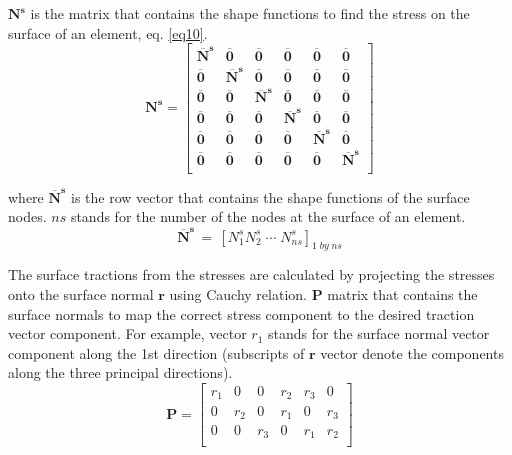\documentclass{article}
\begin{document}
$\mathbf{N^s}$ is the matrix that contains the shape functions to find the stress on the surface of an element, eq. \eqref{eq10}. 
\begin{equation}
\mathbf{N^s} = \left[{ \begin{array}{cccccc}
		\mathbf{\overline{N}^s} & \mathbf{\overline{0}} & \mathbf{\overline{0}} & \mathbf{\overline{0}} & \mathbf{\overline{0}} & \mathbf{\overline{0}} \\
		\mathbf{\overline{0}} & \mathbf{\overline{N}^s} & \mathbf{\overline{0}} & \mathbf{\overline{0}} & \mathbf{\overline{0}} & \mathbf{\overline{0}} \\
		\mathbf{\overline{0}} & \mathbf{\overline{0}} & \mathbf{\overline{N}^s} & \mathbf{\overline{0}} & \mathbf{\overline{0}} & \mathbf{\overline{0}} \\
		\mathbf{\overline{0}} & \mathbf{\overline{0}} & \mathbf{\overline{0}} & \mathbf{\overline{N}^s} & \mathbf{\overline{0}} & \mathbf{\overline{0}} \\
		\mathbf{\overline{0}} & \mathbf{\overline{0}} & \mathbf{\overline{0}} & \mathbf{\overline{0}} & \mathbf{\overline{N}^s} & \mathbf{\overline{0}} \\
		\mathbf{\overline{0}} & \mathbf{\overline{0}} & \mathbf{\overline{0}} & \mathbf{\overline{0}} & \mathbf{\overline{0}} & \mathbf{\overline{N}^s} \\
\end{array}} \right] 
\label{eq10}
\end{equation}

where $\mathbf{\overline{N}^s}$ is the row vector that contains the shape functions of the surface nodes. $ns$ stands for the number of the nodes at the surface of an element.
\begin{equation}
\mathbf{\overline{N}^s} \,=\, \left[ N^s_{1} N^s_{2} \; \cdots\; N^s_{ns} \right]_{1 \;by\; ns}
\end{equation}

The surface tractions from the stresses are calculated by projecting the stresses onto the surface normal $\mathbf{r}$ using Cauchy relation. $\mathbf{P}$ matrix that contains the surface normals to map the correct stress component to the desired traction vector component. For example, vector $r_1$ stands for the surface normal vector component along the 1st direction (subscripts of $\mathbf{r}$ vector denote the components along the three principal directions).
\begin{equation}
\mathbf{P} = \left[{ \begin{array}{cccccc}
		r_1 & 0 & 0 & r_2 & r_3 & 0 \\
		0 & r_2 & 0 & r_1 & 0 & r_3 \\
		0 & 0 & r_3 & 0 & r_1 & r_2 \\
\end{array}} \right]
\label{eqnormals}
\end{equation}
\end{document}
